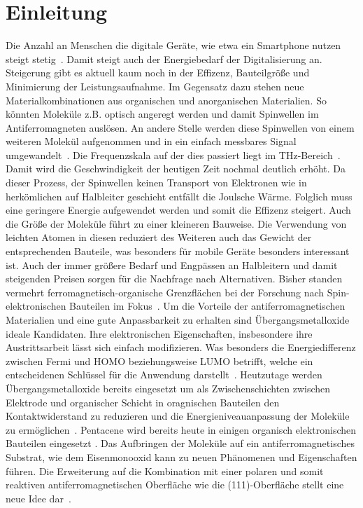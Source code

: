 \chapter{Einleitung}
    Die Anzahl an Menschen die digitale Geräte, wie etwa ein Smartphone nutzen steigt stetig~\cite{Statista}.
    Damit steigt auch der Energiebedarf der Digitalisierung an.
    Steigerung gibt es aktuell kaum noch in der Effizenz, Bauteilgröße und Minimierung der Leistungsaufnahme.
    Im Gegensatz dazu stehen neue Materialkombinationen aus organischen und anorganischen Materialien.
    So könnten Moleküle z.B. optisch angeregt werden und damit Spinwellen im Antiferromagneten auslösen. 
    An andere Stelle werden diese Spinwellen von einem weiteren Molekül aufgenommen und in ein einfach messbares Signal umgewandelt~\cite{SINFONIA}.
    Die Frequenzskala auf der dies passiert liegt im \si{\tera\hertz}-Bereich~\cite{AFM_5}.
    Damit wird die Geschwindigkeit der heutigen Zeit nochmal deutlich erhöht.
    Da dieser Prozess, der Spinwellen keinen Transport von Elektronen wie in herkömlichen auf Halbleiter geschieht entfällt die Joulsche Wärme.
    Folglich muss eine geringere Energie aufgewendet werden und somit die Effizenz steigert.
    Auch die Größe der Moleküle führt zu einer kleineren Bauweise.
    Die Verwendung von leichten Atomen in diesen reduziert des Weiteren auch das Gewicht der entsprechenden Bauteile, was besonders für mobile Geräte besonders interessant ist.
    Auch der immer größere Bedarf und Engpässen an Halbleitern \cite{Idealo} und damit steigenden Preisen sorgen für die Nachfrage nach Alternativen.
    Bisher standen vermehrt ferromagnetisch-organische Grenzflächen bei der Forschung nach Spin-elektronischen Bauteilen im Fokus~\cite{ma-DJ}.
    Um die Vorteile der antiferromagnetischen Materialien und eine gute Anpassbarkeit zu erhalten sind Übergangsmetalloxide ideale Kandidaten.
    Ihre elektronischen Eigenschaften, insbesondere ihre Austrittsarbeit lässt sich einfach modifizieren.
    Was besonders die Energiedifferenz zwischen Fermi und HOMO beziehungsweise LUMO betrifft, welche ein entscheidenen Schlüssel für die Anwendung darstellt~\cite{5A_4}.
    Heutzutage werden Übergangsmetalloxide bereits eingesetzt um als Zwischenschichten zwischen Elektrode und organischer Schicht in oragnischen Bauteilen den Kontaktwiderstand zu reduzieren und die Energieniveauanpassung der Moleküle zu ermöglichen~\cite{IF_11}.
    Pentacene wird bereits heute in einigen organisch elektronischen Bauteilen eingesetzt \cite{5A_4}.
    Das Aufbringen der Moleküle auf ein antiferromagnetisches Substrat, wie dem Eisenmonooxid kann zu neuen Phänomenen und Eigenschaften führen.
    Die Erweiterung auf die Kombination mit einer polaren und somit reaktiven antiferromagnetischen Oberfläche wie die  (111)-Oberfläche stellt eine neue Idee dar~\cite{Cappus et al. - 1993 - Hydroxyl groups on oxide surfaces NiO(100), NiO(1.pdf}.


